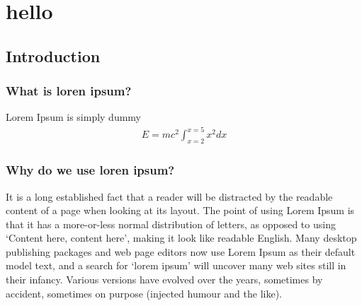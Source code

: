 
\part{hello}
\chapter{Introduction}  %

\ifpdf
    \graphicspath{{chapter1/figs/raster/}{chapter1/figs/pdf/}{chapter1/figs/}}
\else
    \graphicspath{{chapter1/figs/vector/}{chapter1/figs/}}
\fi


\section{What is loren ipsum?} %

Lorem Ipsum is simply dummy \cite{stegmann_plastic_2022}
\begin{align}
    E = mc^2 \int_{x=2}^{x=5} x^2 dx
\end{align}

\section{Why do we use loren ipsum?} %


It is a long established fact that a reader will be distracted by the readable content of a page when looking at its layout. The point of using Lorem Ipsum is that it has a more-or-less normal distribution of letters, as opposed to using `Content here, content here', making it look like readable English. Many desktop publishing packages and web page editors now use Lorem Ipsum as their default model text, and a search for `lorem ipsum' will uncover many web sites still in their infancy. Various versions have evolved over the years, sometimes by accident, sometimes on purpose (injected humour and the like).


